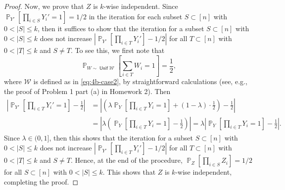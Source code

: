 \documentclass[letterpaper, reqno,11pt]{article}
\newcommand{\PP}{\mathop{{}\mathbb{P}}}
\DeclareMathOperator{\Unif}{\mathsf{Unif}}
\begin{document}
\begin{enumerate}[label=(\alph*)]
\begin{proof}
    Now, we prove that $Z$ is $k$-wise independent. Since $\PP_{Y'}[\prod_{i \in S} Y_i' = 1] = 1/2$ in the iteration for each subset $S \subset [n]$ with $0 < |S| \leq k$, then it suffices to show that the iteration for a subset $S \subset [n]$ with $0 < |S| \leq k$ does not increase $|\PP_{Y'}[\prod_{i \in T} Y_i'] - 1/2|$ for all $T \subset [n]$ with $0 < |T| \leq k$ and $S \neq T$. To see this, we first note that
    $$ \PP_{W \sim \Unif \mathcal W}\left[\sum_{i \in T} W_i = 1\right] = \frac{1}{2}, $$
    where $\mathcal W$ is defined as in \eqref{eq:4b-case2}, by straightforward calculations (see, e.g., the proof of Problem 1 part (a) in Homework 2). Then
    \begin{align*}
      \left|\PP_{Y'}\left[\prod_{i \in T} Y_i' = 1\right] - \frac{1}{2}\right| &= \left|\left(\lambda\PP_Y\left[\prod_{i \in T} Y_i = 1\right] + (1 - \lambda) \cdot \frac{1}{2}\right) - \frac{1}{2}\right| \\
      &= \left|\lambda\left(\PP_Y\left[\prod_{i \in T} Y_i = 1\right] - \frac{1}{2}\right)\right| = \lambda \left|\PP_Y\left[\prod_{i \in T} Y_i = 1\right] - \frac{1}{2}\right|.
    \end{align*}
    Since $\lambda \in (0, 1]$, then this shows that the iteration for a subset $S \subset [n]$ with $0 < |S| \leq k$ does not increase $|\PP_{Y'}[\prod_{i \in T} Y_i'] - 1/2|$ for all $T \subset [n]$ with $0 < |T| \leq k$ and $S \neq T$. Hence, at the end of the procedure, $\PP_Z[\prod_{i \in S} Z_i] = 1/2$ for all $S \subset [n]$ with $0 < |S| \leq k$. This shows that $Z$ is $k$-wise independent, completing the proof.
  \end{proof}
\end{enumerate}
\end{document}
